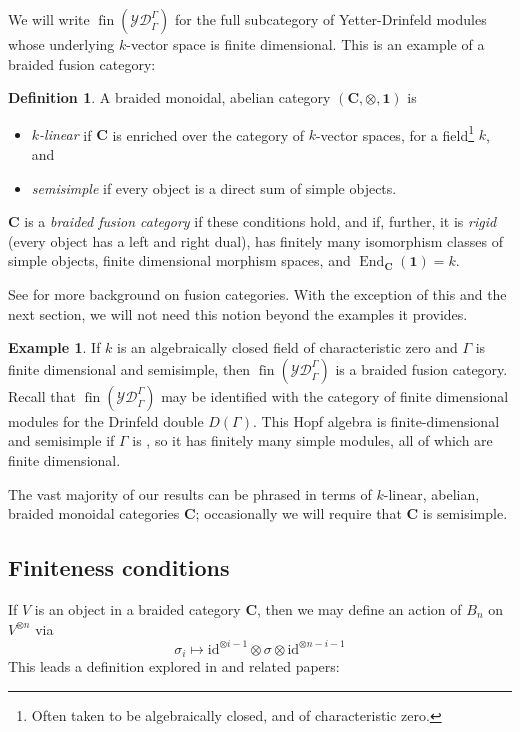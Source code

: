 \documentclass[12pt]{article}
\DeclareMathOperator{\fin}{fin}
\DeclareMathOperator{\End}{End}
\newcommand{\bC} {\mathbf{C}}
\newcommand{\one} {\mathbf{1}}
\newcommand{\YD} {\mathcal{YD}}
\newcommand{\id}{\mbox{id}}
\theoremstyle{plain}
\theoremstyle{definition}
\newtheorem{defn}[thm]{Definition}
\newtheorem{exmp}[thm]{Example}
\theoremstyle{remark}
\begin{document}
We will write $\fin({\YD}^{\Gamma}_{\Gamma})$ for the full subcategory of Yetter-Drinfeld modules whose underlying $k$-vector space is finite dimensional.  This is an example of a braided fusion category: 

\begin{defn}

A braided monoidal, abelian category $(\bC, \otimes, \one)$ is 
\begin{itemize} 
\item \emph{$k$-linear} if $\bC$ is enriched over the category of $k$-vector spaces, for a field\footnote{Often taken to be algebraically closed, and of characteristic zero.} $k$, and
\item \emph{semisimple} if every object is a direct sum of simple objects. 
\end{itemize}
%
$\bC$ is a \emph{braided fusion category} if these conditions hold, and if, further, it is \emph{rigid} (every object has a left and right dual), has finitely many isomorphism classes of simple objects, finite dimensional morphism spaces, and $\End_{\bC}(\one) = k$. 

\end{defn}

See \cite{eno, egno, meir} for more background on fusion categories.  With the exception of this and the next section, we will not need this notion beyond the examples it provides.

\begin{exmp} If $k$ is an algebraically closed field of characteristic zero and $\Gamma$ is finite dimensional and semisimple, then $\fin(\YD_{\Gamma}^{\Gamma})$ is a braided fusion category.  Recall that $\fin(\YD_{\Gamma}^{\Gamma})$ may be identified with the category of finite dimensional modules for the Drinfeld double $D(\Gamma)$.  This Hopf algebra is finite-dimensional and semisimple if $\Gamma$ is \cite{radford_drinfeld}, so it has finitely many simple modules, all of which are finite dimensional.  \end{exmp} 

The vast majority of our results can be phrased in terms of $k$-linear, abelian, braided monoidal categories $\bC$; occasionally we will require that $\bC$ is semisimple.


\subsection{Finiteness conditions}

If $V$ is an object in a braided category $\bC$, then we may define an action of $B_n$ on $V^{\otimes n}$ via 
%
$$\sigma_i \mapsto \id^{\otimes i-1} \otimes \sigma \otimes \id^{\otimes n-i-1}$$
%
This leads a definition explored in \cite{naidu-rowell} and related papers:
\end{document}
